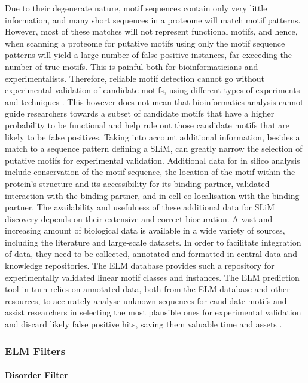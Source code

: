 \documentclass[12pt]{article}
\begin{document}
	Due to their degenerate nature, motif sequences contain only very little
	information, and many short sequences in a proteome will match motif patterns.
	However, most of these matches will not represent functional motifs, and hence,
	when scanning a proteome for putative motifs using only the motif sequence
	patterns will yield a large number of false positive instances, far exceeding
	the number of true motifs.
	This is painful both for bioinformaticians and experimentalists.
	Therefore, reliable motif detection cannot go without
	experimental validation of candidate motifs, using different types of
	experiments and techniques \citep{26581338}. This however does not mean that
	bioinformatics analysis cannot guide researchers towards a subset of candidate
	motifs that have a higher probability to be functional and help rule out those
	candidate motifs that are likely to be false positives. Taking into account
	additional information, besides a match to a sequence pattern defining a SLiM,
	can greatly narrow the selection of putative motifs for experimental validation.
	Additional data for in silico analysis include conservation of the motif
	sequence, the location of the motif within the protein's structure and its
	accessibility for its binding partner, validated interaction with the binding
	partner, and in-cell co-localisation with the binding partner. The availability
	and usefulness of these additional data for SLiM discovery depends on their
	extensive and correct biocuration. A vast and increasing amount of biological
	data is available in a wide variety of sources, including the literature and
	large-scale datasets. In order to facilitate integration of data, they need to
	be collected, annotated and formatted in central data and knowledge
	repositories. The ELM database provides such a repository for experimentally
	validated linear motif classes and instances. The ELM prediction tool in turn
	relies on annotated data, both from the ELM database and other resources, to
	accurately analyse unknown sequences for candidate motifs and assist researchers
	in selecting the most plausible ones for experimental validation and discard
	likely false positive hits, saving them valuable time and assets
	\citep{22110040}.

	\subsubsection*{ELM Filters}

	\paragraph*{Disorder Filter}\label{DisorderFilter}
\end{document}
